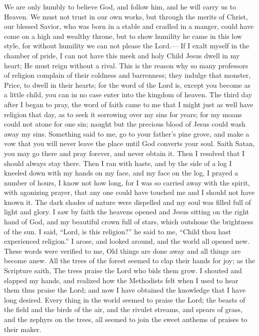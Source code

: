 We are only humbly to believe God, and follow him, and he will carry us to Heaven.
We must not trust in our own works, but through the merits of Christ, our blessed Savior, who was born in a stable and cradled in a manger, could have come on a high and wealthy throne, but to show humility he came in this low style, for without humility we can not please the Lord.---%
If I exalt myself in the chamber of pride, I can not have this meek and holy Child%
\markpage%
Jesus dwell in my heart; He must reign without a rival.
This is the reason why so many professors of religion complain of their coldness and barrenness; they indulge that monster, Price, to dwell in their hearts; for the word of the Lord is, except you become as a little child, you can in no case enter into the kingdom of heaven.
The third day after I began to pray, the word of faith came to me that I might just as well have religion that day, as to seek it sorrowing over my sins for years; for my moans could not atone for one sin; naught but the precious blood of Jesus could wash away my sins.
Something said to me, go to your father's pine grove, and make a vow that you will never leave the place until God converts your soul.
Saith Satan, you may go there and pray forever, and never obtain it.
Then I resolved that I should always stay there.
Then I ran with haste, and by the side of a log I kneeled down with my hands on my face, and my face on the log, I prayed a number of hours, I know not how long, for I was so carried away with the spirit, with agonizing prayer, that any one could have touched me and I should not have known it.
The dark shades of nature were dispelled and my soul was filled full of light and glory.
I saw by faith the heavens opened and Jesus sitting on the right hand of God, and my beautiful crown full of stars, which outshone the brightness of the sun.
I said, ``Lord, is this religion?'' he said to me, ``Child thou hast experienced religion.''
I arose, and looked around, and the world all opened new.
These words were verified to me, Old things are done away and all things are become anew.
All the trees of the forest seemed to clap their hands for joy; as the Scripture saith, The trees praise the Lord who bids them grow.
I shouted and slapped my hands, and realized how the Methodists felt when I used to hear them thus praise the Lord; and now I have obtained the knowledge that I have long desired.
Every thing in the world seemed to praise the Lord; the beasts of the field and the birds of the air, and the rivulet streams, and spears of grass, and the zephyrs on the trees, all seemed to join the sweet anthems of praises to their maker.
